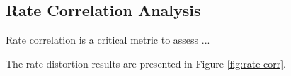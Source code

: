 \subsection{Rate Correlation Analysis}

Rate correlation is a critical metric to assess ...

The rate distortion results are presented in Figure \ref{fig:rate-corr}.

